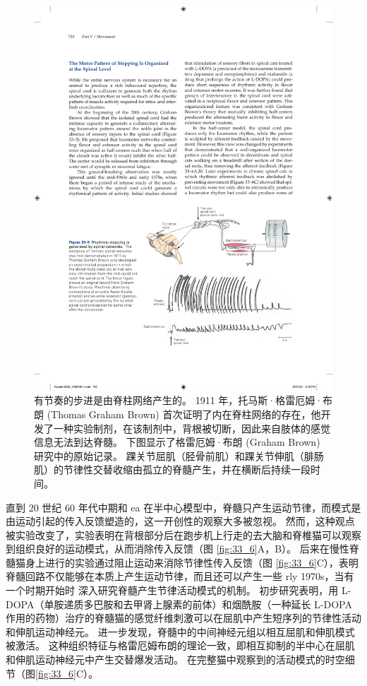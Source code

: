 \begin{figure}[htbp]
	\centering
	\includegraphics[width=0.7\linewidth]{chap33/fig_33_5}
	\caption{有节奏的步进是由脊柱网络产生的。 1911 年，托马斯·格雷厄姆·布朗 (Thomas Graham Brown) 首次证明了内在脊柱网络的存在，他开发了一种实验制剂，在该制剂中，背根被切断，因此来自肢体的感觉信息无法到达脊髓。 下图显示了格雷厄姆·布朗 (Graham Brown) 研究中的原始记录。 踝关节屈肌（胫骨前肌）和踝关节伸肌（腓肠肌）的节律性交替收缩由孤立的脊髓产生，并在横断后持续一段时间。}
	\label{fig:33_5}
\end{figure}

直到 20 世纪 60 年代中期和 ea 在半中心模型中，脊髓只产生运动节律，而模式是由运动引起的传入反馈塑造的，这一开创性的观察大多被忽视。 
然而，这种观点被实验改变了，实验表明在背根部分后在跑步机上行走的去大脑和脊椎猫可以观察到组织良好的运动模式，从而消除传入反馈（图 \ref{fig:33_6}A，B）。 
后来在慢性脊髓猫身上进行的实验通过阻止运动来消除节律性传入反馈（图 \ref{fig:33_6}C），表明脊髓回路不仅能够在本质上产生运动节律，而且还可以产生一些 rly 1970s，当有一个时期开始时 深入研究脊髓产生节律活动模式的机制。 初步研究表明，用 L-DOPA（单胺递质多巴胺和去甲肾上腺素的前体）和烟酰胺（一种延长 L-DOPA 作用的药物）治疗的脊髓猫的感觉纤维刺激可以在屈肌中产生短序列的节律性活动 和伸肌运动神经元。 进一步发现，脊髓中的中间神经元组以相互屈肌和伸肌模式被激活。 
这种组织特征与格雷厄姆布朗的理论一致，即相互抑制的半中心在屈肌和伸肌运动神经元中产生交替爆发活动。
在完整猫中观察到的活动模式的时空细节（图\ref{fig:33_6}C）。

